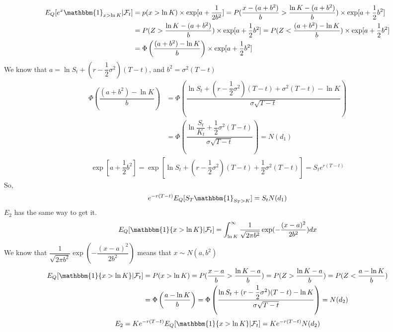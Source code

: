\documentclass[12pt]{article}
\newcommand{\ind}{\mathbbm{1}}
\begin{document}
\begin{align*}
    E_Q[e^x\ind_{x>\ln K}|\mathcal{F}_t] & = p(x>\ln K)\times \exp[a+\dfrac{1}{2b^2}] = P(\dfrac{x-(a+b^2)}{b} > \dfrac{\ln K-(a+b^2)}{b})\times \exp[a+\dfrac{1}{2}b^2]\\
    & = P(Z > \dfrac{\ln K-(a+b^2)}{b})\times \exp[a+\dfrac{1}{2}b^2] = P(Z < \dfrac{(a+b^2)-\ln K}{b})\times \exp[a+\dfrac{1}{2}b^2]\\
    & = \Phi \left(\dfrac{(a+b^2)-\ln K}{b}\right)\times \exp[a+\dfrac{1}{2}b^2]
\end{align*}
We know that $a = \ln S_t + (r-\dfrac{1}{2}\sigma^2) (T-t)$, and $b^2 = \sigma^2 (T-t)$
\begin{align*}
    \Phi \left(\dfrac{(a+b^2)-\ln K}{b}\right) & = \Phi \left(\dfrac{\ln S_t + (r-\dfrac{1}{2}\sigma^2) (T-t) + \sigma^2 (T-t) - \ln K}{\sigma\sqrt{T-t}}\right)\\
    & = \Phi \left(\dfrac{\ln \dfrac{S_t}{K_t} +\dfrac{1}{2}\sigma^2(T-t)}{\sigma\sqrt{T-t}}\right) = N(d_1)
\end{align*}
\begin{align*}
    \exp [a+\dfrac{1}{2}b^2] = \exp [\ln S_t + (r-\dfrac{1}{2}\sigma^2)(T-t) + \dfrac{1}{2}\sigma^2(T-t)] = S_te^{r(T-t)}
\end{align*}
So,
\begin{align*}
    e^{-r(T-t)}E_Q[S_T\ind_{S_T>K}] = S_tN(d_1)
\end{align*}
$E_2$ has the same way to get it.\\
\begin{align*}
    E_Q[\ind{x>\ln K}|\mathcal{F}_t] = \int_{\ln K}^{\infty}\dfrac{1}{\sqrt{2\pi b^2}}\exp(-\dfrac{(x-a)^2}{2b^2})dx
\end{align*}
We know that $\dfrac{1}{\sqrt{2\pi b^2}}\exp(-\dfrac{(x-a)^2}{2b^2})$ means that $x\sim N(a, b^2)$\\
\begin{align*}
    E_Q[\ind{x>\ln K}|\mathcal{F}_t] &= P(x>\ln K) = P(\dfrac{x-a}{b} > \dfrac{\ln K - a}{b}) = P(Z > \dfrac{\ln K - a}{b}) = P(Z < \dfrac{a - \ln K}{b})\\
    & = \Phi \left(\dfrac{a - \ln K}{b}\right) = \Phi \left(\dfrac{\ln S_t + (r-\dfrac{1}{2}\sigma^2) (T-t) - \ln K}{\sigma\sqrt{T-t}}\right) = N(d_2)
\end{align*}
\begin{align*}
    E_2 = Ke^{-r(T-t)}E_Q[\ind{x>\ln K}|\mathcal{F}_t] = Ke^{-r(T-t)}N(d_2)
\end{align*}
\end{document}

